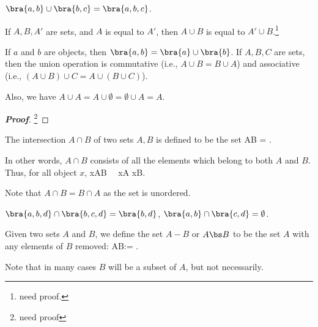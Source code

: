 \begin{example}
$\bra{a,b}\cup \bra{b,c} = \bra{a,b,c}$.
\end{example}

\begin{remark}
If $A,B,A'$ are sets, and $A$ is equal to $A'$, then $A\cup B$ is equal to $A'\cup B$.\footnote{need proof.}
\end{remark}

\begin{lemma}
If $a$ and $b$ are objects, then $\bra{a,b} = \bra{a}\cup \bra{b}$. If $A,B,C$ are sets, then the union operation is commutative (i.e., $A\cup B = B\cup A$) and associative (i.e., $(A\cup B)\cup C = A \cup (B\cup C)$).

Also, we have $A\cup A = A \cup \emptyset = \emptyset \cup A = A$.
\end{lemma}

\begin{proof}[\bf Proof]
\footnote{need proof}
\end{proof}

\begin{definition}\label{def:intersection_pairwise}
The intersection $A\cap B$ of two sets $A,B$ is defined to be the set
\be
A\cap B = .
\ee

In other words, $A\cap B$ consists of all the elements which belong to both $A$ and $B$. Thus, for all object $x$,
\be
x\in A\cap B \ \lra \ x\in A x\in B.
\ee

Note that $A\cap B = B\cap A$ as the set is unordered.
\end{definition}

\begin{example}
$\bra{a,b,d}\cap\bra{b,c,d} = \bra{b,d}$, $\bra{a,b}\cap \bra{c,d} = \emptyset$.
\end{example}

\begin{definition}\label{def:difference_set}
Given two sets $A$ and $B$, we define the set $A-B$ or $A\bs B$ to be the set $A$ with any elements of $B$ removed:
\be
A\bs B:= .
\ee

Note that in many cases $B$ will be a subset of $A$, but not necessarily.
\end{definition}

